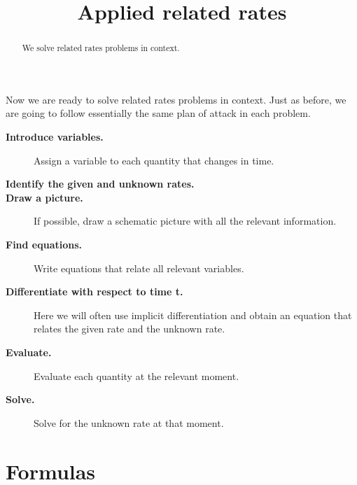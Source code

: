 \documentclass{ximera}
\title[Dig-In:]{Applied related rates}
\begin{document}
\begin{abstract}
  We solve related rates problems in context.
\end{abstract}
\maketitle

Now we are ready to solve related rates problems in context. Just as
before, we are going to follow essentially the same plan of attack in
each problem.


\begin{description}
\item[\textbf{Introduce variables.}] Assign a variable to each quantity that changes in time.
\item[\textbf{Identify the given and unknown rates.}] 
\item[\textbf{Draw a picture.}] If possible, draw a schematic picture with all the relevant information. 
\item[\textbf{Find equations.}] Write equations that relate all
  relevant variables.
\item[\textbf{Differentiate with respect to time t.}] Here we will often use
  implicit differentiation and obtain an equation that relates the given rate and the unknown rate. 
\item[\textbf{Evaluate.}] Evaluate
each quantity at the  relevant moment.
 \item[\textbf{Solve.}] Solve
 for the unknown rate at that moment.
\end{description}



\section{Formulas}
\end{document}
